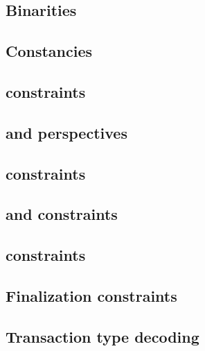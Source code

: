 \subsection{Binarities}                              \label{rlp txn v2: generalities: binarities}                     
\subsection{Constancies}                             \label{rlp txn v2: generalities: constancies}                    
\subsection{\locPhaseFlagSum{} constraints}          \label{rlp txn v2: generalities: phase flag sum}                 
\subsection{\locPerspFlagSum{} and perspectives}     \label{rlp txn v2: generalities: perspectives}                   
\subsection{\phaseEnd{} constraints}                 \label{rlp txn v2: generalities: PHASE_END constraints}          
\subsection{\ct{} and \maxCt{} constraints}          \label{rlp txn v2: generalities: ct and ct_max}                  
\subsection{\userTransactionNumber{} constraints}    \label{rlp txn v2: generalities: user transaction number}        
\subsection{Finalization constraints}                \label{rlp txn v2: generalities: heartbeat}                      
\subsection{Transaction type decoding}               \label{rlp txn v2: generalities: transaction row constraints}    
